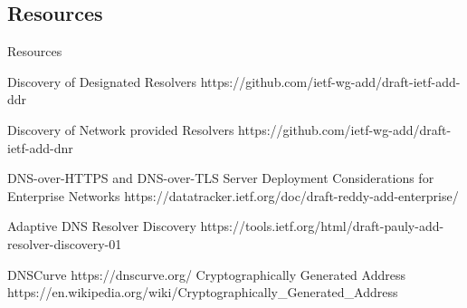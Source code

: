 \documentclass{ctexbeamer}
\begin{document}
\subsection{Resources}
\begin{frame}{Resources}

    \begin{thebibliography}{99}
         Discovery of Designated Resolvers
            https://github.com/ietf-wg-add/draft-ietf-add-ddr

          Discovery of Network provided Resolvers 
            https://github.com/ietf-wg-add/draft-ietf-add-dnr

         DNS-over-HTTPS and DNS-over-TLS Server Deployment Considerations for Enterprise Networks
            https://datatracker.ietf.org/doc/draft-reddy-add-enterprise/

         Adaptive DNS Resolver Discovery
            https://tools.ietf.org/html/draft-pauly-add-resolver-discovery-01

         DNSCurve
            https://dnscurve.org/
          Cryptographically Generated Address 
            https://en.wikipedia.org/wiki/Cryptographically\_Generated\_Address

    \end{thebibliography}

\end{frame}
\end{document}
